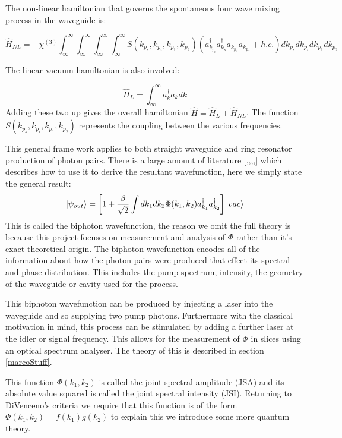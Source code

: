 The non-linear hamiltonian that governs the spontaneous four wave mixing process in the waveguide is:

\begin{equation}
\hat H_{NL} = -\chi^{(3)}\int_\infty^\infty\int_\infty^\infty\int_\infty^\infty\int_\infty^\infty S(k_{p_s},k_{p_i},k_{p_1},k_{p_2})( a_{k_{p_i}}^{\dagger}a_{k_{s}}^{\dagger}a_{k_{p_1}}a_{k_{p_2}} + h.c.)dk_{p_s}dk_{p_i}dk_{p_1}dk_{p_2}
\end{equation}

%
\noindent
The linear vacuum hamiltonian is also involved:

\begin{equation}
\hat H_{L} = \int_\infty^\infty a_{k}^{\dagger}a_{k}dk
\end{equation}
\noindent
Adding these two up gives the overall hamiltonian $\hat H = \hat H_{L} + \hat H_{NL}$. The function $S(k_{p_s},k_{p_i},k_{p_1},k_{p_2})$ represents the coupling between the various frequencies. 

This general frame work applies to both straight waveguide and ring resonator production of photon pairs. There is a large amount of literature [,,,,] which describes how to use it to derive the resultant wavefunction, here we simply state the general result:
\begin{equation}
\ket{\psi_{out}}=\left [1 + \frac{\beta}{\sqrt{2}}\int dk_1dk_2\Phi(k_1,k_2)a_{k_1}^{\dagger}a_{k_2}^{\dagger} \right ]\ket{vac} \label{JSAWavefunct}
\end{equation}
This is called the biphoton wavefunction, the reason we omit the full theory is because this project focuses on measurement and analysis of $\Phi$ rather than it's exact theoretical origin. The biphoton wavefunction encodes all of the information about how the photon pairs were produced that effect its spectral and phase distribution. This includes the pump spectrum, intensity, the geometry of the waveguide or cavity used for the process.

This biphoton wavefunction can be produced by injecting a laser into the waveguide and so supplying two pump photons. Furthermore with the classical motivation in mind, this process can be stimulated by adding a further laser at the idler or signal frequency. This allows for the measurement of $\Phi$ in slices using an optical spectrum analyser. The theory of this is described in section \ref{marcoStuff}.


This function $\Phi(k_1,k_2)$ is called the joint spectral amplitude (JSA) and its absolute value squared is called the joint spectral intensity (JSI). Returning to DiVenceno's criteria we require that this function is of the form $\Phi(k_1,k_2)=f(k_1)g(k_2)$ to explain this we introduce some more quantum theory.

